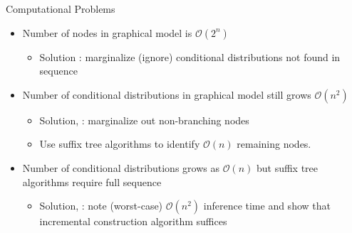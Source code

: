 \begin{frame}[t]{Computational Problems}
\begin{itemize}
\item Number of nodes in graphical model is $\mathcal{O}(2^n)$
\begin{itemize}
\item Solution : marginalize (ignore) conditional distributions not found in sequence
\end{itemize}
\item Number of conditional distributions in graphical model still grows $\mathcal{O}(n^2)$
\begin{itemize}
\item Solution, \citet{Wood2009} : marginalize out non-branching nodes \cite{Pitman1999, Ho2006}
\item Use suffix tree algorithms to identify  $\mathcal{O}(n)$ remaining nodes.
\end{itemize}
\item Number of conditional distributions grows as $\mathcal{O}(n)$ but suffix tree algorithms require full sequence
\begin{itemize}
\item Solution, \citet{Gasthaus2010} : note (worst-case) $\mathcal{O}(n^2)$ inference time and show that incremental construction algorithm suffices
\end{itemize}
\end{itemize}
\end{frame}

 
